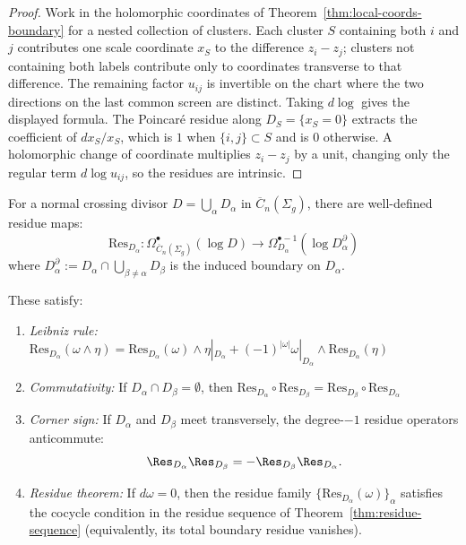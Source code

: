 \begin{proof}
Work in the holomorphic coordinates of
Theorem~\ref{thm:local-coords-boundary} for a nested collection of
clusters. Each cluster $S$ containing both $i$ and $j$ contributes one
scale coordinate $x_S$ to the difference $z_i-z_j$; clusters not
containing both labels contribute only to coordinates transverse to that
difference. The remaining factor $u_{ij}$ is invertible on the chart
where the two directions on the last common screen are distinct. Taking
$d\log$ gives the displayed formula. The Poincar\'e residue along
$D_S=\{x_S=0\}$ extracts the coefficient of $dx_S/x_S$, which is $1$
when $\{i,j\}\subset S$ and is $0$ otherwise. A holomorphic change of
coordinate multiplies $z_i-z_j$ by a unit, changing only the regular
term $d\log u_{ij}$, so the residues are intrinsic.
\end{proof}

\begin{theorem}\label{thm:residue-operations}
For a normal crossing divisor $D = \bigcup_\alpha D_\alpha$ in $\overline{C}_n(\Sigma_g)$, there are well-defined residue maps:
\[\text{Res}_{D_\alpha}: \Omega^{\bullet}_{\overline{C}_n(\Sigma_g)}(\log D) \to \Omega^{\bullet-1}_{D_\alpha}(\log D_\alpha^\partial)\]
where $D_\alpha^\partial := D_\alpha \cap \bigcup_{\beta\neq\alpha} D_\beta$ is the induced boundary on $D_\alpha$.

These satisfy:
\begin{enumerate}
\item \emph{Leibniz rule:} $\text{Res}_{D_\alpha}(\omega \wedge \eta) = \text{Res}_{D_\alpha}(\omega) \wedge \eta|_{D_\alpha} + (-1)^{|\omega|}\omega|_{D_\alpha} \wedge \text{Res}_{D_\alpha}(\eta)$
\item \emph{Commutativity:} If $D_\alpha \cap D_\beta = \emptyset$, then $\text{Res}_{D_\alpha} \circ \text{Res}_{D_\beta} = \text{Res}_{D_\beta} \circ \text{Res}_{D_\alpha}$
\item \emph{Corner sign:} If $D_\alpha$ and $D_\beta$ meet
 transversely, the degree-$-1$ residue operators anticommute:
 \[
 \Res_{D_\alpha}\Res_{D_\beta}
 =
 -\Res_{D_\beta}\Res_{D_\alpha}.
 \]
\item \emph{Residue theorem:} If $d\omega=0$, then the residue family $\{\text{Res}_{D_\alpha}(\omega)\}_\alpha$ satisfies the cocycle condition in the residue sequence of Theorem~\ref{thm:residue-sequence} (equivalently, its total boundary residue vanishes).
\end{enumerate}
\end{theorem}

